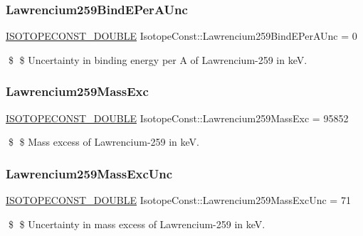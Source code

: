 \subsubsection{\texorpdfstring{Lawrencium259\+Bind\+E\+Per\+A\+Unc}{Lawrencium259BindEPerAUnc}}
{\footnotesize\ttfamily \mbox{\hyperlink{group___isotope_const-_macros_ga8f45a7272ce02c0b4c65c44636ed719a}{I\+S\+O\+T\+O\+P\+E\+C\+O\+N\+S\+T\+\_\+\+D\+O\+U\+B\+LE}} Isotope\+Const\+::\+Lawrencium259\+Bind\+E\+Per\+A\+Unc = 0}

\$ \$ Uncertainty in binding energy per A of Lawrencium-\/259 in keV. \mbox{\label{group___isotope_const-_lawrencium-_lr259_ga8f9a546df5ec567bb4a165234012998f}} 
\subsubsection{\texorpdfstring{Lawrencium259\+Mass\+Exc}{Lawrencium259MassExc}}
{\footnotesize\ttfamily \mbox{\hyperlink{group___isotope_const-_macros_ga8f45a7272ce02c0b4c65c44636ed719a}{I\+S\+O\+T\+O\+P\+E\+C\+O\+N\+S\+T\+\_\+\+D\+O\+U\+B\+LE}} Isotope\+Const\+::\+Lawrencium259\+Mass\+Exc = 95852}

\$ \$ Mass excess of Lawrencium-\/259 in keV. \mbox{\label{group___isotope_const-_lawrencium-_lr259_ga6782bceb8843c4dc163d80bfbe19b669}} 
\subsubsection{\texorpdfstring{Lawrencium259\+Mass\+Exc\+Unc}{Lawrencium259MassExcUnc}}
{\footnotesize\ttfamily \mbox{\hyperlink{group___isotope_const-_macros_ga8f45a7272ce02c0b4c65c44636ed719a}{I\+S\+O\+T\+O\+P\+E\+C\+O\+N\+S\+T\+\_\+\+D\+O\+U\+B\+LE}} Isotope\+Const\+::\+Lawrencium259\+Mass\+Exc\+Unc = 71}

\$ \$ Uncertainty in mass excess of Lawrencium-\/259 in keV. \mbox{\label{group___isotope_const-_lawrencium-_lr259_gaccb0e0e75b8af6b4ca7b0b58260ce96a}} 
